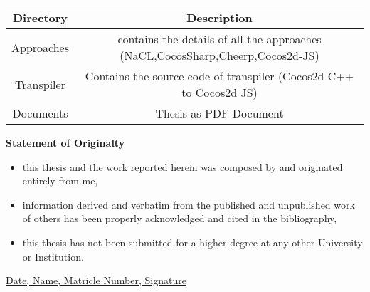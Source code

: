 \documentclass[23pt]{article}
\begin{document}
\begin{center}
 \begin{tabular}{||c c||} 
 \hline
 Directory & Description\\ [0.5ex] 
 \hline\hline
 Approaches& contains the details of all the approaches (NaCL,CocosSharp,Cheerp,Cocos2d-JS) \\ 
 \hline
 Transpiler & Contains the source code of transpiler (Cocos2d C++ to Cocos2d JS)  \\
 \hline
 Documents & Thesis as PDF Document \\ [1ex] 
 \hline
\end{tabular}
\end{center}


\newpage

{\Large \textbf{Statement of Originalty}
\begin{itemize}
  \item this thesis and the work reported herein was composed by and originated entirely from me,
  \item information derived and verbatim from the published and unpublished work of others has been properly acknowledged and cited in the bibliography,
  \item  this thesis has not been submitted for a higher degree at any other University or Institution.
\end{itemize}
\underline{Date, Name, Matricle Number, Signature}
\par}


\newpage
\end{document}
